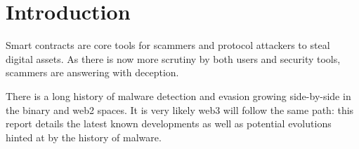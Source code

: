 \section{Introduction} \label{chap:introduction}

Smart contracts are core tools for scammers and protocol attackers to steal digital assets.
As there is now more scrutiny by both users and security tools, scammers are answering with deception.

There is a long history of malware detection and evasion growing side-by-side in the binary and web2 spaces.
It is very likely web3 will follow the same path: this report details the latest known developments as well as potential evolutions hinted at by the history of malware.
